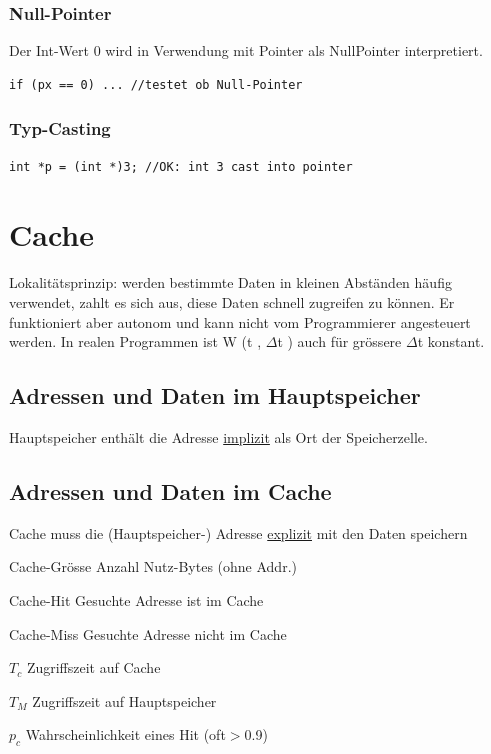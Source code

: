 \documentclass[8pt,landscape,a4paper]{scrartcl}
\newcommand{\drule}[3][0]{%
	\tikz[baseline]{\path[decoration={markings,
			mark=between positions 0 and 1 step 2*#3
			with {\node[fill, circle, minimum width=#3, inner sep=0pt, anchor=south west] {};}},postaction={decorate}]  (0,#1) -- ++(#2,0);}}
\begin{document}
\begin{multicols*}{5}
\subsubsection{Null-Pointer}
Der Int-Wert 0 wird in Verwendung mit Pointer als NullPointer interpretiert.
\begin{lstlisting}
if (px == 0) ... //testet ob Null-Pointer
\end{lstlisting}
\subsubsection{Typ-Casting}
\begin{lstlisting}
int *p = (int *)3; //OK: int 3 cast into pointer
\end{lstlisting}



\columnbreak



\section{Cache}
	\textcolor{b}{Lokalitätsprinzip:} werden bestimmte Daten in kleinen Abständen häufig verwendet, zahlt es sich aus, diese Daten schnell zugreifen zu können. Er funktioniert aber autonom und kann nicht vom Programmierer angesteuert werden. In realen Programmen ist W (t , $\Delta$t ) auch für grössere $\Delta$t konstant.
	 
\subsection{Adressen und Daten im Hauptspeicher}
Hauptspeicher enthält die Adresse \underline{implizit} als Ort der Speicherzelle.
\subsection{Adressen und Daten im Cache}	
Cache muss die (Hauptspeicher-) Adresse \underline{explizit} mit den Daten speichern\\
\drule{5.5cm}{1pt}
\begin{compactitem} [$\bullet$]
	\item \textcolor{b}{Cache-Grösse} Anzahl Nutz-Bytes (ohne Addr.)
	\item \textcolor{b}{Cache-Hit} Gesuchte Adresse ist im Cache
	\item \textcolor{b}{Cache-Miss} Gesuchte Adresse nicht im Cache
	\item \textcolor{b}{$T_c$} Zugriffszeit auf Cache
	\item \textcolor{b}{$T_M$} Zugriffszeit auf Hauptspeicher
	\item \textcolor{b}{$p_c$} Wahrscheinlichkeit eines Hit (oft$>$0.9)
\end{compactitem}
\drule{5.5cm}{1pt}

\end{multicols*}
\end{document}
